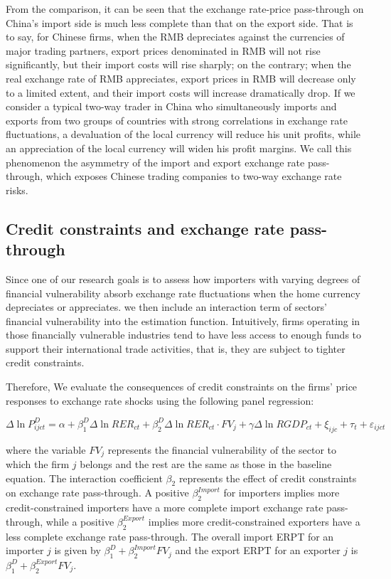 \documentclass[12pt]{article}
\begin{document}
From the comparison, it can be seen that the exchange rate-price pass-through on China's import side is much less complete than that on the export side. That is to say, for Chinese firms, when the RMB depreciates against the currencies of major trading partners, export prices denominated in RMB will not rise significantly, but their import costs will rise sharply; on the contrary; when the real exchange rate of RMB appreciates, export prices in RMB will decrease only to a limited extent, and their import costs will increase dramatically drop. If we consider a typical two-way trader in China who simultaneously imports and exports from two groups of countries with strong correlations in exchange rate fluctuations, a devaluation of the local currency will reduce his unit profits, while an appreciation of the local currency will widen his profit margins. We call this phenomenon the asymmetry of the import and export exchange rate pass-through, which exposes Chinese trading companies to two-way exchange rate risks.

\subsection{Credit constraints and exchange rate pass-through}

Since one of our research goals is to assess how importers with varying degrees of financial vulnerability absorb exchange rate fluctuations when the home currency depreciates or appreciates. we then include an interaction term of sectors’ financial vulnerability into the estimation function. Intuitively, firms operating in those financially vulnerable industries tend to have less access to enough funds to support their international trade activities, that is, they are subject to tighter credit constraints.

Therefore, We evaluate the consequences of credit constraints on the firms' price responses to exchange rate shocks using the following panel regression:

\begin{equation}
	\Delta \ln P^{D}_{ijct}=\alpha+\beta^D_{1} \Delta \ln RER_{ct}+\beta^D_{2} \Delta \ln RER_{ct} \cdot FV_{j}+\gamma \Delta \ln RGDP_{ct}+\xi_{ijc}+\tau_{t} +\varepsilon_{ijct}
	\label{eq.credit}
\end{equation}

where the variable $FV_{j}$ represents the financial vulnerability of the sector to which the firm $j$ belongs and the rest are the same as those in the baseline equation. The interaction coefficient $\beta_2$ represents the effect of credit constraints on exchange rate pass-through. A positive $\beta^{Import}_2$ for importers implies more credit-constrained importers have a more complete import exchange rate pass-through, while a positive $\beta^{Export}_2$ implies more credit-constrained exporters have a less complete exchange rate pass-through. The overall import ERPT for an importer $j$ is given by $\beta^D_{1} +\beta^{Import}_{2} FV_j$ and the export ERPT for an exporter $j$ is  $\beta^D_{1} +\beta^{Export}_{2} FV_j$.
\end{document}
